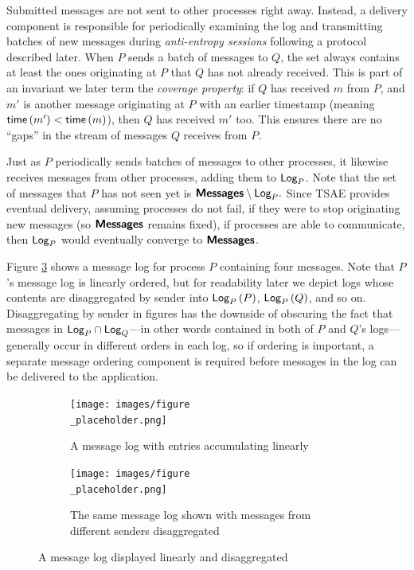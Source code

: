 \documentclass[]             %
{NASA}                       %
\theoremstyle{definition}
\begin{document}
Submitted messages are not sent to other processes right away.
Instead, a delivery component is responsible for periodically
examining the log and transmitting batches of new messages during
\emph{anti-entropy sessions} following a protocol described
later. When $P$ sends a batch of messages to $Q$, the set always
contains at least the ones originating at $P$ that $Q$ has not already
received. This is part of an invariant we later term the
\emph{coverage property}: if $Q$ has received $m$ from $P$, and $m'$
is another message originating at $P$ with an earlier timestamp
(meaning $\mathsf{time}\left(m'\right) < \mathsf{time}\left(m\right)$), then $Q$ has received $m'$
too. This ensures there are no ``gaps'' in the stream of messages $Q$
receives from $P$.

Just as $P$ periodically sends batches of messages to other processes,
it likewise receives messages from other processes, adding them to
$\textsf{Log}_{P}$.  Note that the set of messages that $P$ has not seen yet is
$\textbf{\textsf{Messages}} \setminus \textsf{Log}_{P}.$ Since TSAE provides eventual delivery, assuming
processes do not fail, if they were to stop originating new messages
(so $\textbf{\textsf{Messages}}$ remains fixed), if processes are able to communicate, then
$\textsf{Log}_{P}$ would eventually converge to $\textbf{\textsf{Messages}}$.

Figure \ref{fig:message-log} shows a message log for process $P$
containing four messages. Note that $P$'s message log is linearly
ordered, but for readability later we depict logs whose contents are
disaggregated by sender into $\textsf{Log}_{P}\left(P\right)$, $\textsf{Log}_{P}\left(Q\right)$, and so
on. Disaggregating by sender in figures has the downside of obscuring
the fact that messages in $\textsf{Log}_{P} \cap \textsf{Log}_{Q}$---in other words
contained in both of $P$ and $Q$'s logs---generally occur in different
orders in each log, so if ordering is important, a separate message
ordering component is required before messages in the log can be
delivered to the application.

\begin{figure}
  \setlength\belowcaptionskip{0ex}
  \begin{subfigure}{1\textwidth}
    \centering
    \texttt{[image: images/figure\\\_placeholder.png]}
    \caption{A message log with entries accumulating linearly}
    \label{fig:message-log-a}
  \end{subfigure}
  \begin{subfigure}{1\textwidth}
    \centering
    \texttt{[image: images/figure\\\_placeholder.png]}
    \caption{The same message log shown with messages from different senders disaggregated}
    \label{fig:message-log-b}
  \end{subfigure}
  \caption{A message log displayed linearly and disaggregated}
  \label{fig:message-log}
\end{figure}
\end{document}
